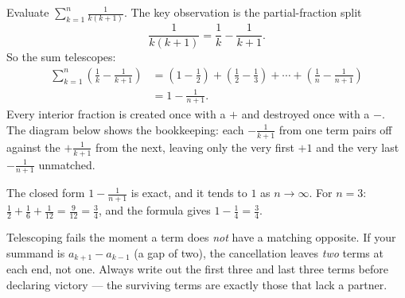 \begin{example}
\label{ch37:ex-telescope}
Evaluate $\displaystyle\sum_{k=1}^{n}\frac{1}{k(k+1)}$. The key observation is the
partial-fraction split
\[
  \frac{1}{k(k+1)} = \frac{1}{k} - \frac{1}{k+1}.
\]
So the sum telescopes:
\begin{align*}
  \sum_{k=1}^{n}\!\left(\frac1k - \frac{1}{k+1}\right)
    &= \left(1 - \tfrac12\right) + \left(\tfrac12 - \tfrac13\right) + \cdots + \left(\tfrac1n - \tfrac{1}{n+1}\right) \\
    &= 1 - \frac{1}{n+1}.
\end{align*}
Every interior fraction is created once with a $+$ and destroyed once with a $-$.
The diagram below shows the bookkeeping: each $-\tfrac1{k+1}$ from one term
pairs off against the $+\tfrac1{k+1}$ from the next, leaving only the very first
$+1$ and the very last $-\tfrac{1}{n+1}$ unmatched.

\begin{center}
\end{center}

The closed form $1 - \tfrac{1}{n+1}$ is exact, and it tends to $1$ as
$n \to \infty$. For $n=3$: $\tfrac12 + \tfrac16 + \tfrac{1}{12} = \tfrac{9}{12} =
\tfrac34$, and the formula gives $1 - \tfrac14 = \tfrac34$.
\end{example}

\begin{trapbox}
Telescoping fails the moment a term does \emph{not} have a matching opposite. If
your summand is $a_{k+1} - a_{k-1}$ (a gap of two), the cancellation leaves
\emph{two} terms at each end, not one. Always write out the first three and last
three terms before declaring victory --- the surviving terms are exactly those
that lack a partner.
\end{trapbox}

